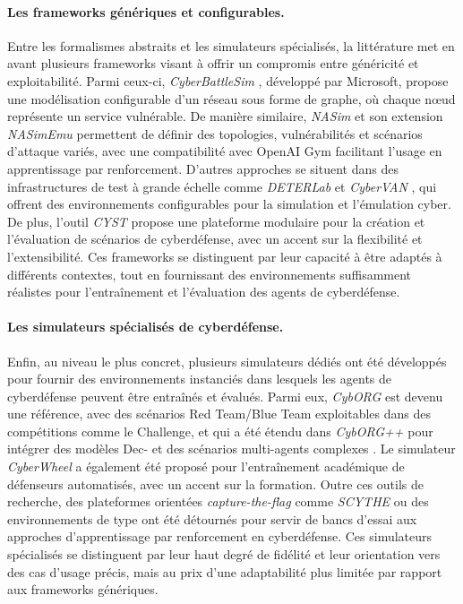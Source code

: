 \paragraph{Les frameworks génériques et configurables.}
Entre les formalismes abstraits et les simulateurs spécialisés, la littérature met en avant plusieurs frameworks visant à offrir un compromis entre généricité et exploitabilité. Parmi ceux-ci, \textit{CyberBattleSim} \cite{cyberbattlesim}, développé par Microsoft, propose une modélisation configurable d’un réseau sous forme de graphe, où chaque nœud représente un service vulnérable. De manière similaire, \textit{NASim} \cite{nasim2023} et son extension \textit{NASimEmu} \cite{fernandes2024nasimemu} permettent de définir des topologies, vulnérabilités et scénarios d’attaque variés, avec une compatibilité avec OpenAI Gym facilitant l’usage en apprentissage par renforcement. D’autres approches se situent dans des infrastructures de test à grande échelle comme \textit{DETERLab} et \textit{CyberVAN} \cite{Mirkovic2010}, qui offrent des environnements configurables pour la simulation et l’émulation cyber. De plus, l'outil \textit{CYST} \cite{Drasar2020} propose une plateforme modulaire pour la création et l’évaluation de scénarios de cyberdéfense, avec un accent sur la flexibilité et l’extensibilité. Ces frameworks se distinguent par leur capacité à être adaptés à différents contextes, tout en fournissant des environnements suffisamment réalistes pour l’entraînement et l’évaluation des agents de cyberdéfense.

\paragraph{Les simulateurs spécialisés de cyberdéfense.}
Enfin, au niveau le plus concret, plusieurs simulateurs dédiés ont été développés pour fournir des environnements instanciés dans lesquels les agents de cyberdéfense peuvent être entraînés et évalués. Parmi eux, \textit{CybORG} \cite{Standen2021} est devenu une référence, avec des scénarios Red Team/Blue Team exploitables dans des compétitions comme le  Challenge, et qui a été étendu dans \textit{CybORG++} pour intégrer des modèles Dec- et des scénarios multi-agents complexes \cite{landolt2025cyborgpp}. Le simulateur \textit{CyberWheel} \cite{vyas2025cyberwheel} a également été proposé pour l’entraînement académique de défenseurs automatisés, avec un accent sur la formation. Outre ces outils de recherche, des plateformes orientées \textit{capture-the-flag} comme \textit{SCYTHE} ou des environnements de type  \cite{palmer2023ctf} ont été détournés pour servir de bancs d’essai aux approches d’apprentissage par renforcement en cyberdéfense. Ces simulateurs spécialisés se distinguent par leur haut degré de fidélité et leur orientation vers des cas d’usage précis, mais au prix d’une adaptabilité plus limitée par rapport aux frameworks génériques.

